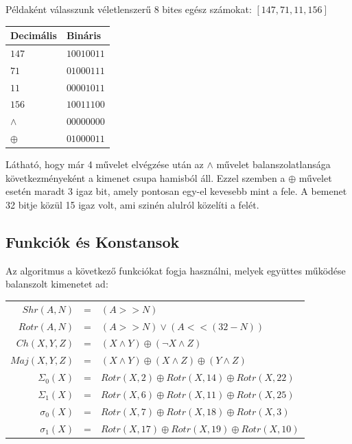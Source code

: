 Példaként válasszunk véletlenszerű 8 bites egész számokat: $[147, 71, 11, 156]$

\begin{table}[H]
\centering
    \begin{tabular}{|l|l|}
        \hline
        \textbf{Decimális} & \textbf{Bináris} \\
        \hline
        \hline
        $147$   &   $10010011$ \\
        \hline
        $71$   &   $01000111$ \\
        \hline
        $11$   &   $00001011$ \\
        \hline
        $156$   &   $10011100$ \\
        \hline
        \hline
        $\land$   &   $00000000$ \\
        \hline
        $\oplus$   &   $01000011$ \\
        \hline
    \end{tabular}
\end{table}


Látható, hogy már 4 művelet elvégzése után az $\land$ művelet balanszolatlansága következményeként a kimenet csupa hamisból áll. Ezzel szemben a $\oplus$ művelet esetén maradt 3 igaz bit, amely pontosan egy-el kevesebb mint a fele. A bemenet 32 bitje közül 15 igaz volt, ami szinén alulról közelíti a felét.




\subsection{Funkciók és Konstansok}

Az algoritmus a következő funkciókat fogja használni, melyek együttes működése balanszolt kimenetet ad:

\bigbreak

\begin{tabular}{rcl}

    $Shr(A, N)$     & = &   $(A >> N)$ \\
    $Rotr(A, N)$    & = &   $(A >> N) \lor (A << (32 - N)) $ \\
    $Ch(X, Y, Z)$   & = &   $(X \land Y) \oplus (\neg X \land Z)$ \\
    $Maj(X, Y, Z)$  & = &   $(X \land Y) \oplus (X \land Z) \oplus (Y \land Z)$ \\
    $\Sigma_0(X)$   & = &   $Rotr(X, 2)  \oplus Rotr(X, 14) \oplus Rotr(X, 22)$ \\
    $\Sigma_1(X)$   & = &   $Rotr(X, 6)  \oplus Rotr(X, 11) \oplus Rotr(X, 25)$ \\
    $\sigma_0(X)$   & = &   $Rotr(X, 7)  \oplus Rotr(X, 18) \oplus Rotr(X, 3)$  \\
    $\sigma_1(X)$   & = &   $Rotr(X, 17) \oplus Rotr(X, 19) \oplus Rotr(X, 10)$ \\

\end{tabular}


